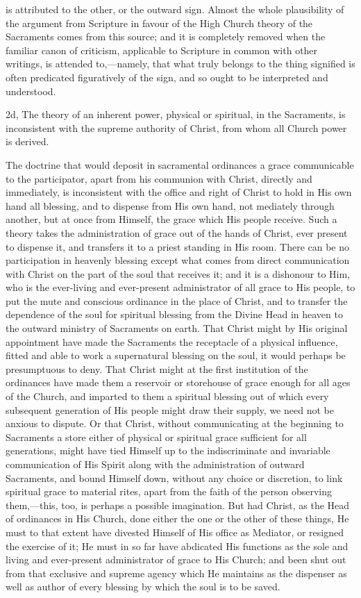 \documentclass[]{book}
\begin{document}
is attributed to the other, or the outward sign. Almost the whole plausibility of the argument from Scripture in favour of the High Church theory of the Sacraments comes from this source; and it is completely removed when the familiar canon of criticism, applicable to Scripture in common with other writings, is attended to,---namely, that what truly belongs to the thing signified is often predicated figuratively of the sign, and so ought to be interpreted and understood.

2d, The theory of an inherent power, physical or spiritual, in the Sacraments, is inconsistent with the supreme authority of Christ, from whom all Church power is derived.

The doctrine that would deposit in sacramental ordinances a grace communicable to the participator, apart from his communion with Christ, directly and immediately, is inconsistent with the office and right of Christ to hold in His own hand all blessing, and to dispense from His own hand, not mediately through another, but at once from Himself, the grace which His people receive. Such a theory takes the administration of grace out of the hands of Christ, ever present to dispense it, and transfers it to a priest standing in His room. There can be no participation in heavenly blessing except what comes from direct communication with Christ on the part of the soul that receives it; and it is a dishonour to Him, who is the ever-living and ever-present administrator of all grace to His people, to put the mute and conscious ordinance in the place of Christ, and to transfer the dependence of the soul for spiritual blessing from the Divine Head in heaven to the outward ministry of Sacraments on earth. That Christ might by His original appointment have made the Sacraments the receptacle of a physical influence, fitted and able to work a supernatural blessing on the soul, it would perhaps be presumptuous to deny. That Christ might at the first institution of the ordinances have made them a reservoir or storehouse of grace enough for all ages of the Church, and imparted to them a spiritual blessing out of which every subsequent generation of His people might draw their supply, we need not be anxious to dispute. Or that Christ, without communicating at the beginning to Sacraments a store either of physical or spiritual grace sufficient for all generations, might have tied Himself up to the indiscriminate and invariable communication of His Spirit along with the administration of outward Sacraments, and bound Himself down, without any choice or discretion, to link spiritual grace to material rites, apart from the faith of the person observing them,---this, too, is perhaps a possible imagination. But had Christ, as the Head of ordinances in His Church, done either the one or the other of these things, He must to that extent have divested Himself of His office as Mediator, or resigned the exercise of it; He must in so far have abdicated His functions as the sole and living and ever-present administrator of grace to His Church; and been shut out from that exclusive and supreme agency which He maintains as the dispenser as well as author of every blessing by which the soul is to be saved.
\end{document}
